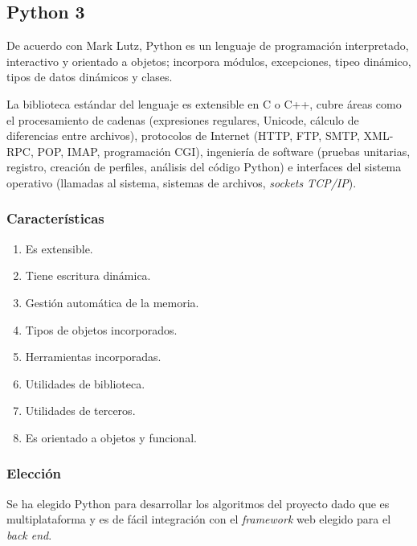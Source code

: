 \subsection{Python 3 }
De acuerdo con Mark Lutz\cite{lutz_learning_2013}, Python es un lenguaje de programación interpretado, interactivo y orientado a objetos; incorpora módulos, excepciones, tipeo dinámico, tipos de datos dinámicos y clases.


La biblioteca estándar del lenguaje es extensible en C o C++, cubre áreas como el procesamiento de cadenas (expresiones regulares, Unicode, cálculo de diferencias entre archivos), protocolos de Internet (HTTP, FTP, SMTP, XML-RPC, POP, IMAP, programación CGI), ingeniería de software (pruebas unitarias, registro, creación de perfiles, análisis del código Python) e interfaces del sistema operativo (llamadas al sistema, sistemas de archivos, \textit{sockets TCP/IP}).

\subsubsection*{Características}
\begin{enumerate}
    \item Es extensible.
    \item Tiene escritura dinámica.
    \item Gestión automática de la memoria.
    \item Tipos de objetos incorporados.
    \item Herramientas incorporadas.
    \item Utilidades de biblioteca.
    \item Utilidades de terceros.
    \item Es orientado a objetos y funcional.
\end{enumerate}


\subsubsection*{Elección}
Se ha elegido Python para desarrollar los algoritmos del proyecto dado que es multiplataforma y es de fácil integración con el \textit{framework} web elegido para el \textit{back end}.